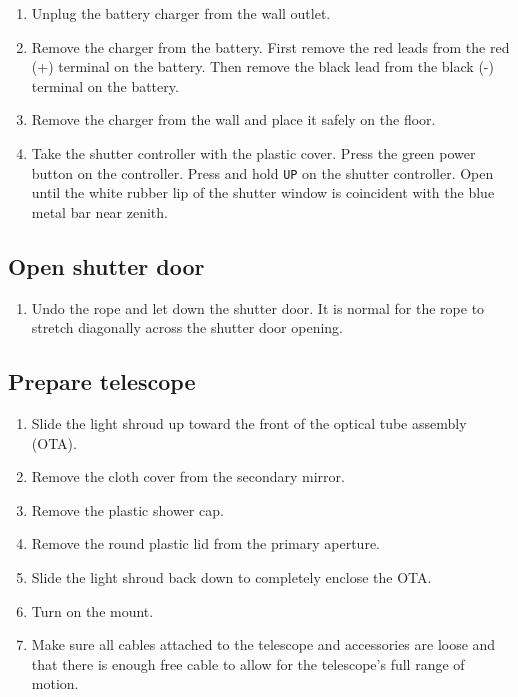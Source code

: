 \documentclass{article}
\begin{document}
	\begin{enumerate}
		
		\item Unplug the battery charger from the wall outlet.
		
		\item Remove the charger from the battery. First remove the red leads from the red (+) terminal on the battery. Then remove the black lead from the black (-) terminal on the battery.
		
		\item Remove the charger from the wall and place it safely on the floor.
		
		\item Take the shutter controller with the plastic cover. Press the green power button on the controller. Press and hold \texttt{UP} on the shutter controller. Open until the white rubber lip of the shutter window is coincident with the blue metal bar near zenith.
		
	\end{enumerate}
	
	\subsection{Open shutter door}
	\label{sec:open-shutter-door}
	
	\begin{enumerate}
		
		\item Undo the rope and let down the shutter door. It is normal for the rope to stretch diagonally across the shutter door opening.
		
	\end{enumerate}
	
	\subsection{Prepare telescope}
	\label{sec:prepare-telescope}
	
	\begin{enumerate}
		
		\item Slide the light shroud up toward the front of the optical tube assembly (OTA).
		
		\item Remove the cloth cover from the secondary mirror.
		
		\item Remove the plastic shower cap.
		
		\item Remove the round plastic lid from the primary aperture.
		
		\item Slide the light shroud back down to completely enclose the OTA.
		
		\item Turn on the mount.
		
		\item Make sure all cables attached to the telescope and accessories are loose and that there is enough free cable to allow for the telescope's full range of motion.
		
	\end{enumerate}
	
\end{document}
